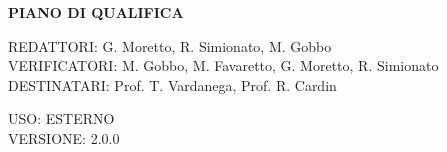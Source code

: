 \documentclass[5pt]{article}
\begin{document}
	\vspace{24pt}
	
	\begin{center}
		\textbf{\LARGE PIANO DI QUALIFICA}
	\end{center}
	
	\vspace{13pt}
	
	\begin{flushleft}
		\begin{spacing}{1.5}
			REDATTORI: G. Moretto, R. Simionato, M. Gobbo\\%
			VERIFICATORI: M. Gobbo, M. Favaretto, G. Moretto, R. Simionato\\
			\vspace{7pt}
			DESTINATARI: Prof. T. Vardanega, Prof. R. Cardin\\%
		\end{spacing}
	\end{flushleft}
	
	\begin{flushright}
		\begin{spacing}{1}
			USO: ESTERNO\\
			VERSIONE: 2.0.0\\
		\end{spacing}
	\end{flushright}
	
	
	\restoregeometry
	
	\pagebreak
	
\end{document}
